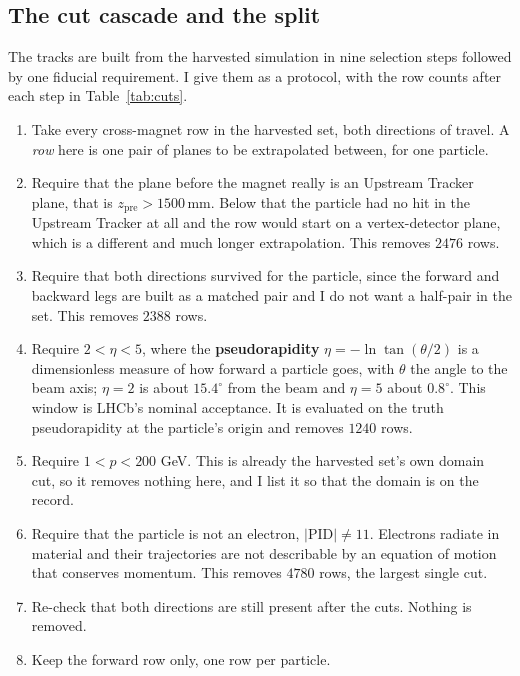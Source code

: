 \documentclass[11pt,a4paper]{article}
\newcommand{\mm}{\ensuremath{\,\mathrm{mm}}}
\begin{document}
\subsection{The cut cascade and the split}
\label{sec:data-cuts}

The tracks are built from the harvested simulation in nine selection steps
followed by one fiducial requirement. I give them as a protocol, with the row
counts after each step in Table~\ref{tab:cuts}.

\begin{enumerate}\setlength{\itemsep}{2pt}
  \item Take every cross-magnet row in the harvested set, both directions of
  travel. A \emph{row} here is one pair of planes to be extrapolated between,
  for one particle.
  \item Require that the plane before the magnet really is an Upstream Tracker
  plane, that is $z_{\mathrm{pre}} > 1500\mm$. Below that the particle had no
  hit in the Upstream Tracker at all and the row would start on a vertex-detector
  plane, which is a different and much longer extrapolation. This removes
  $2476$ rows.
  \item Require that both directions survived for the particle, since the
  forward and backward legs are built as a matched pair and I do not want a
  half-pair in the set. This removes $2388$ rows.
  \item Require $2 < \eta < 5$, where the \textbf{pseudorapidity}
  $\eta = -\ln\tan(\theta/2)$ is a dimensionless measure of how forward a
  particle goes, with $\theta$ the angle to the beam axis; $\eta = 2$ is about
  $15.4^\circ$ from the beam and $\eta = 5$ about $0.8^\circ$. This window is
  LHCb's nominal acceptance. It is evaluated on the truth pseudorapidity at the
  particle's origin and removes $1240$ rows.
  \item Require $1 < p < 200$ GeV. This is already the harvested set's own
  domain cut, so it removes nothing here, and I list it so that the domain is
  on the record.
  \item Require that the particle is not an electron, $|\mathrm{PID}| \neq 11$.
  Electrons radiate in material and their trajectories are not describable by an
  equation of motion that conserves momentum. This removes $4780$ rows, the
  largest single cut.
  \item Re-check that both directions are still present after the cuts. Nothing
  is removed.
  \item Keep the forward row only, one row per particle.

\end{enumerate}
\end{document}
